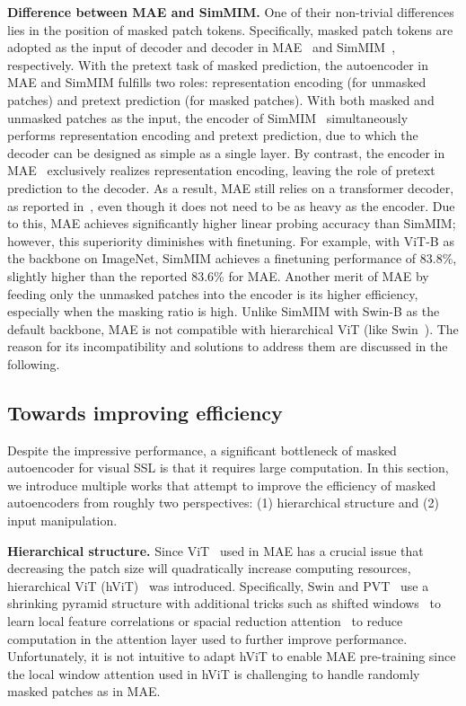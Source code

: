 \documentclass[10pt,journal,compsoc]{IEEEtran}
\begin{document}
\textbf{Difference between MAE and SimMIM.} One of their non-trivial differences lies in the position of masked patch tokens. Specifically, masked patch tokens are adopted as the input of decoder and decoder in MAE~\cite{he2022masked} and SimMIM~\cite{xie2022simmim}, respectively. With the pretext task of masked prediction, the autoencoder in MAE and SimMIM fulfills two roles: representation encoding (for unmasked patches) and pretext prediction (for masked patches). With both masked and unmasked patches as the input, the encoder of  SimMIM~\cite{xie2022simmim} simultaneously performs representation encoding and pretext prediction, due to which the decoder can be designed as simple as a single layer. By contrast, the encoder in MAE~\cite{he2022masked} exclusively realizes representation encoding, leaving the role of pretext prediction to the decoder. As a result, MAE still relies on a transformer decoder, as reported in~\cite{he2022masked}, even though it does not need to be as heavy as the encoder. Due to this, MAE achieves significantly higher linear probing accuracy than SimMIM; however, this superiority diminishes with finetuning. For example, with ViT-B as the backbone on ImageNet, SimMIM achieves a finetuning performance of 83.8\%, slightly higher than the reported 83.6\% for MAE. Another merit of MAE by feeding only the unmasked patches into the encoder is its higher efficiency, especially when the masking ratio is high. Unlike SimMIM with Swin-B as the default backbone, MAE is not compatible with hierarchical ViT (like Swin~\cite{wang2021pvt,liu2021swin}). The reason for its incompatibility and solutions to address them are discussed in the following.  



\subsection{Towards improving efficiency}
Despite the impressive performance, a significant bottleneck of masked autoencoder for visual SSL is that it requires large computation. In this section, we introduce multiple works that attempt to improve the efficiency of masked autoencoders from roughly two perspectives: (1) hierarchical structure and (2) input manipulation. 


\textbf{Hierarchical structure.} 
Since ViT~\cite{dosovitskiy2021an} used in MAE has a crucial issue that decreasing the patch size will quadratically increase computing resources, hierarchical ViT (hViT)~\cite{wang2021pvt,liu2021swin} was introduced. Specifically, Swin and PVT~\cite{liu2021swin, wang2021pvt} use a shrinking pyramid structure with additional tricks such as shifted windows~\cite{liu2021swin} to learn local feature correlations or spacial reduction attention~\cite{wang2021pvt} to reduce computation in the attention layer used to further improve performance. Unfortunately, it is not intuitive to adapt hViT to enable MAE pre-training since the local window attention used in hViT is challenging to handle randomly masked patches as in MAE. 
\end{document}
